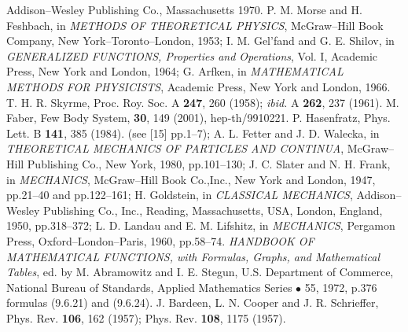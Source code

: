 \documentclass[a4paper,12pt] {article}
\begin{document}
\begin{thebibliography}{9}
Addison--Wesley Publishing Co., Massachusetts 1970.
\bibitem{[18]}
P. M. Morse and H. Feshbach,
in {\it METHODS OF THEORETICAL PHYSICS}, McGraw--Hill  
Book Company, New York--Toronto--London, 1953;
I. M. Gel'fand and G. E. Shilov,
in {\it GENERALIZED FUNCTIONS, Properties and Operations}, Vol. I, 
Academic Press, New York and London, 1964;
G. Arfken,
in {\it MATHEMATICAL METHODS FOR PHYSICISTS}, Academic Press,
New York and London, 1966.
\bibitem{[19]} 
T. H. R. Skyrme, Proc. Roy. Soc. A {\bf 247}, 260
(1958); {\it ibid.} A {\bf 262}, 237 (1961).
\bibitem{[20]}
M. Faber,
Few Body System, {\bf 30}, 149 (2001), hep-th/9910221.
\bibitem{[21]}
P. Hasenfratz,
Phys. Lett. B {\bf 141}, 385 (1984).
\bibitem{[22]} 
(see [15] pp.1--7);
A. L. Fetter and J. D. Walecka,
in {\it THEORETICAL MECHANICS OF PARTICLES AND CONTINUA},
McGraw--Hill Publishing Co., New York, 1980, pp.101--130;
J. C. Slater and N. H. Frank,
in {\it MECHANICS}, McGraw--Hill Book Co.,Inc., New York and London,
1947, pp.21--40 and pp.122--161;
H. Goldstein, in {\it CLASSICAL MECHANICS},
Addison--Wesley Publishing Co., Inc., Reading, Massachusetts, USA,
London, England, 1950, pp.318--372;
L. D. Landau and E. M. Lifshitz,
in {\it MECHANICS}, Pergamon Press, 
Oxford--London--Paris, 1960, pp.58--74.
\bibitem{[23]} 
{\it HANDBOOK OF MATHEMATICAL FUNCTIONS, with Formulas,
Graphs, and Mathematical Tables}, ed. by M. Abramowitz and
I. E. Stegun, U.S. Department of Commerce, National Bureau of
Standards, Applied Mathematics Series $\bullet$ 55, 1972, p.376 
formulas (9.6.21) and (9.6.24).
\bibitem{[24]} 
J. Bardeen, L. N. Cooper and J. R. Schrieffer,
Phys. Rev. {\bf 106}, 162 (1957); Phys. Rev. {\bf 108}, 1175 (1957).
\end{thebibliography}
\end{document}
